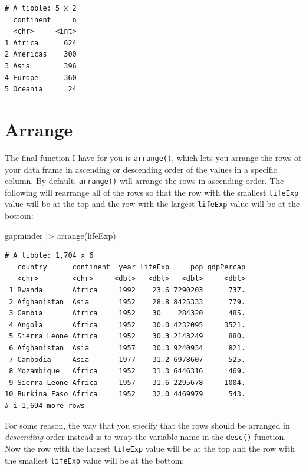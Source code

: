 \documentclass[
  letterpaper,
  DIV=11,
  numbers=noendperiod]{scrreprt}
\newenvironment{Shaded}{\begin{snugshade}}{\end{snugshade}}
\newcommand{\FunctionTok}[1]{\textcolor[rgb]{0.28,0.35,0.67}{#1}}
\newcommand{\NormalTok}[1]{\textcolor[rgb]{0.00,0.23,0.31}{#1}}
\newcommand{\SpecialCharTok}[1]{\textcolor[rgb]{0.37,0.37,0.37}{#1}}
\begin{document}
\begin{verbatim}
# A tibble: 5 x 2
  continent     n
  <chr>     <int>
1 Africa      624
2 Americas    300
3 Asia        396
4 Europe      360
5 Oceania      24
\end{verbatim}

\section{Arrange}\label{arrange}

The final function I have for you is \texttt{arrange()}, which lets you
arrange the rows of your data frame in ascending or descending order of
the values in a specific column. By default, \texttt{arrange()} will
arrange the rows in ascending order. The following will rearrange all of
the rows so that the row with the smallest \texttt{lifeExp} value will
be at the top and the row with the largest \texttt{lifeExp} value will
be at the bottom:

\begin{Shaded}
\begin{Highlighting}[]
\NormalTok{gapminder }\SpecialCharTok{|\textgreater{}}
  \FunctionTok{arrange}\NormalTok{(lifeExp)}
\end{Highlighting}
\end{Shaded}

\begin{verbatim}
# A tibble: 1,704 x 6
   country      continent  year lifeExp     pop gdpPercap
   <chr>        <chr>     <dbl>   <dbl>   <dbl>     <dbl>
 1 Rwanda       Africa     1992    23.6 7290203      737.
 2 Afghanistan  Asia       1952    28.8 8425333      779.
 3 Gambia       Africa     1952    30    284320      485.
 4 Angola       Africa     1952    30.0 4232095     3521.
 5 Sierra Leone Africa     1952    30.3 2143249      880.
 6 Afghanistan  Asia       1957    30.3 9240934      821.
 7 Cambodia     Asia       1977    31.2 6978607      525.
 8 Mozambique   Africa     1952    31.3 6446316      469.
 9 Sierra Leone Africa     1957    31.6 2295678     1004.
10 Burkina Faso Africa     1952    32.0 4469979      543.
# i 1,694 more rows
\end{verbatim}

For some reason, the way that you specify that the rows should be
arranged in \emph{descending} order instead is to wrap the variable name
in the \texttt{desc()} function. Now the row with the largest
\texttt{lifeExp} value will be at the top and the row with the smallest
\texttt{lifeExp} value will be at the bottom:
\end{document}
